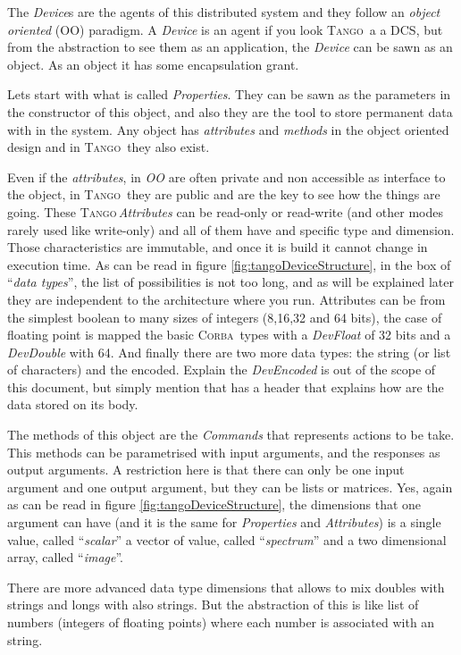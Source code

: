 \documentclass[10pt,a4paper,twoside]{llncs}
\newcommand{\tango}{\textsc{Tango}}
\newcommand{\corba}{\textsc{Corba}}
\begin{document}
The \emph{Device}s are the agents of this distributed system and they follow an \emph{object oriented} (OO) paradigm. A \emph{Device} is an agent if you look \tango\, a a DCS, but from the abstraction to see them as an application, the \emph{Device} can be sawn as an object. As an object it has some encapsulation grant.

Lets start with what is called \emph{Properties}. They can be sawn as the parameters in the constructor of this object, and also they are the tool to store permanent data with in the system. Any object has \emph{attributes} and \emph{methods} in the object oriented design and in \tango\, they also exist.

Even if the \emph{attributes}, in \emph{OO} are often private and non accessible as interface to the object, in \tango\, they are public and are the key to see how the things are going. These \tango\,\emph{Attributes} can be read-only or read-write (and other modes rarely used like write-only) and all of them have and specific type and dimension. Those characteristics are immutable, and once it is build it cannot change in execution time. As can be read in figure \ref{fig:tangoDeviceStructure}, in the box of ``\emph{data types}'', the list of possibilities is not too long, and as will be explained later they are independent to the architecture where you run. Attributes can be from the simplest boolean to many sizes of integers (8,16,32 and 64 bits), the case of floating point is mapped the basic \corba\, types with a \emph{DevFloat} of 32 bits and a \emph{DevDouble} with 64. And finally there are two more data types: the string (or list of characters) and the encoded. Explain the \emph{DevEncoded} is out of 
the scope of this document, but simply mention that has a header that explains how are the data stored on its body.

The methods of this object are the \emph{Commands} that represents actions to be take. This methods can be parametrised with input arguments, and the responses as output arguments. A restriction here is that there can only be one input argument and one output argument, but they can be lists or matrices. Yes, again as can be read in figure \ref{fig:tangoDeviceStructure}, the dimensions that one argument can have (and it is the same for \emph{Properties} and \emph{Attributes}) is a single value, called ``\emph{scalar}'' a vector of value, called ``\emph{spectrum}'' and a two dimensional array, called ``\emph{image}''.

There are more advanced data type dimensions that allows to mix doubles with strings and longs with also strings. But the abstraction of this is like list of numbers (integers of floating points) where each number is associated with an string. 
\end{document}

